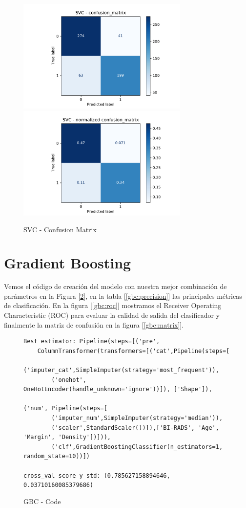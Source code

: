 \documentclass[12pt,twoside]{report}
\begin{document}
\begin{figure}[htp]
\begin{multicols}{2}
\includegraphics[width=8.5cm]{./code/figures_python/confusion_matrix/svc.pdf}%
\columnbreak
\includegraphics[width=8.5cm]{./code/figures_python/confusion_matrix/svc_normalized.pdf}%
\end{multicols}
 \caption{SVC - Confusion Matrix}
  \label{svc:matrix}
 \end{figure}
 
\section*{Gradient Boosting}

Vemos el código de creación del modelo con nuestra mejor combinación de parámetros en la Figura [\ref{gbc:code}], en la tabla [\ref{gbc:precision}] las principales métricas de clasificación. En la figura [\ref{gbc:roc}] mostramos el Receiver Operating Characteristic (ROC) para evaluar la calidad de salida del clasificador y finalmente la matriz de confusión en la figura [\ref{gbc:matrix}].

\begin{figure}[ht]
 \begin{lstlisting}
Best estimator: Pipeline(steps=[('pre',
	ColumnTransformer(transformers=[('cat',Pipeline(steps=[
		('imputer_cat',SimpleImputer(strategy='most_frequent')),
		('onehot', OneHotEncoder(handle_unknown='ignore'))]), ['Shape']),
														('num', Pipeline(steps=[
		('imputer_num',SimpleImputer(strategy='median')),
		('scaler',StandardScaler())]),['BI-RADS', 'Age', 'Margin', 'Density'])])),
		('clf',GradientBoostingClassifier(n_estimators=1, random_state=10))])
                
cross_val score y std: (0.785627158894646, 0.03710160085379686)
 \end{lstlisting}
 \caption{GBC - Code}
 \label{gbc:code}
 \end{figure}
\end{document}
